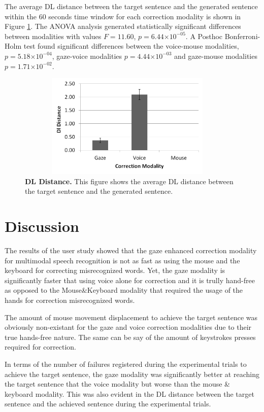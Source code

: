 \documentclass[]{article}
\providecommand{\e}[1]{\ensuremath{\times 10^{#1}}}
\begin{document}
The average DL distance between the target sentence and the generated sentence within the 60 seconds time window for
each correction modality is shown in Figure \ref{dldistance}. The ANOVA analysis generated statistically
significant differences between modalities with values $F=11.60$, $p=6.44\e{-05}$. A Posthoc Bonferroni-Holm test found
significant differences between the voice-mouse modalities, $p=5.18\e{-04}$, gaze-voice modalities $p=4.44\e{-03}$
and gaze-mouse modalities $p=1.71\e{-02}$. 

\begin{figure}[ht]
\begin{center}
\vspace{-3mm}
\includegraphics[width=0.95\textwidth,height=50mm]{figures/dldistance.png}
\end{center}
\caption{\textbf{DL Distance.} This figure shows the average DL distance between the target sentence and the generated
sentence.}
\label{dldistance}
\end{figure}


\section{Discussion}
The results of the user study showed that the gaze enhanced correction modality for multimodal speech recognition is not
as fast as using the mouse and the keyboard for correcting misrecognized words. Yet, the gaze modality is
significantly faster that using voice alone for correction and it is trully hand-free as opposed to the Mouse\&Keyboard
modality that required the usage of the hands for correction misrecognized words.

The amount of mouse movement displacement to achieve the target sentence was obviously non-existant for the gaze and
voice correction modalities due to their true hands-free nature. The same can be say of the amount of keystrokes presses
required for correction.

In terms of the number of failures registered during the experimental trials to achieve the target sentence, the gaze
modality was significantly better at reaching the target sentence that the voice modality but worse than the mouse \&
keyboard modality. This was also evident in the DL distance between the target sentence and the achieved sentence during
the experimental trials.
\end{document}
